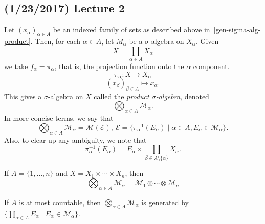 \documentclass[11pt,leqno,oneside]{amsbook}
\numberwithin{thm}{section}
\newcommand{\M}{\mathcal{M}}
\newcommand{\Ep}{\mathcal{E}}
\begin{document}
\subsection*{(1/23/2017) Lecture 2}
\begin{defn}
  Let $(x_\alpha)_{\alpha \in A}$ be an indexed family of sets as
  described above in~\ref{gen-sigma-alg-product}. Then, for each $\alpha \in A$, let $M_\alpha$ be a
  $\sigma$-algebra on $X_\alpha$. Given \[
    X = \prod_{\alpha \in A} X_\alpha
  \]
  we take $f_\alpha = \pi_\alpha$, that is, the projection function onto the $\alpha$ component. \[
    \pi_\alpha\colon  X \to X_\alpha
  \] \[
    (x_\beta)_{\beta \in A} \mapsto x_\alpha.
  \]
  This gives a $\sigma$-algebra on $X$ called the \emph{product
    $\sigma$-algebra}, denoted \[
    \bigotimes_{\alpha \in A} \M_\alpha.
  \]
  In more concise terms, we say that \[
    \bigotimes_{\alpha \in A} \M_\alpha = \M(\Ep), \ \Ep =
    \{\pi_{\alpha}^{-1}(E_\alpha) \mid \alpha \in A, E_\alpha \in
    \M_\alpha \}.
  \]
  Also, to clear up any ambiguity, we note that \[
    \pi_\alpha^{-1}(E_\alpha) = E_\alpha \times \prod_{\beta \in A
      \setminus \{\alpha\}} X_\alpha.
  \]
\end{defn}
\begin{example}
  If $A = \{1, \ldots, n\}$ and $X = X_1 \times \cdots \times X_n$,
  then \[
    \bigotimes_{\alpha \in A} \M_\alpha = \M_1 \otimes \cdots \otimes \M_n
  \]
\end{example}
\begin{prop}
  If $A$ is at most countable, then $\bigotimes_{\alpha \in A}
  \M_\alpha$ is generated by $\{\prod_{\alpha \in A} E_\alpha \mid
  E_\alpha \in \M_\alpha\}$.
\end{prop}
\end{document}
